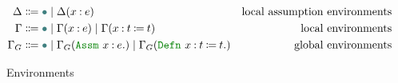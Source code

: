 \begin{figure}
\centering
\begin{align*}
\Delta &\Coloneqq \mt \mid \Delta(\assm{x}{e}) &\text{local assumption environments} \\
\Gamma &\Coloneqq \mt \mid \Gamma(\assm{x}{e}) \mid \Gamma(\defn{x}{t}{t}) &\text{local environments} \\
\Gamma_G &\Coloneqq \mt \mid \Gamma_G(\Assm{x}{e}) \mid \Gamma_G(\Defn{x}{t}{t}) &\text{global environments}
\end{align*}
\caption{Environments}
\label{fig:contexts}
\end{figure}
